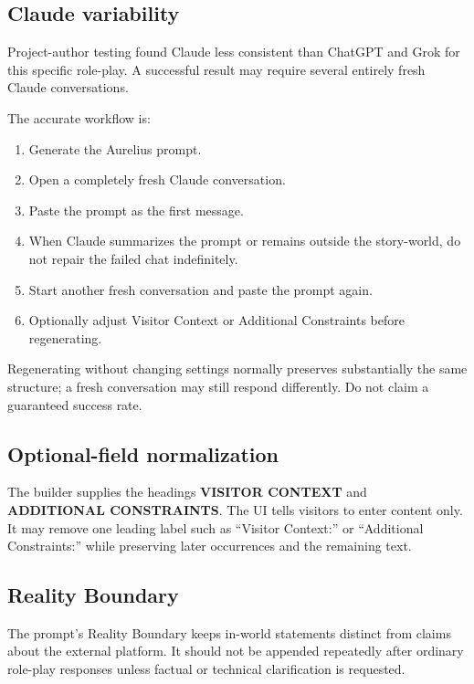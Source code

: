 \documentclass[11pt,letterpaper]{article}
\newcommand{\term}[1]{\textbf{\textsf{#1}}}
\begin{document}
\subsection{Claude variability}

Project-author testing found Claude less consistent than ChatGPT and Grok for
this specific role-play. A successful result may require several entirely
fresh Claude conversations.

The accurate workflow is:

\begin{enumerate}
    \item Generate the Aurelius prompt.
    \item Open a completely fresh Claude conversation.
    \item Paste the prompt as the first message.
    \item When Claude summarizes the prompt or remains outside the story-world,
          do not repair the failed chat indefinitely.
    \item Start another fresh conversation and paste the prompt again.
    \item Optionally adjust Visitor Context or Additional Constraints before
          regenerating.
\end{enumerate}

Regenerating without changing settings normally preserves substantially the
same structure; a fresh conversation may still respond differently. Do not
claim a guaranteed success rate.

\subsection{Optional-field normalization}

The builder supplies the headings \term{VISITOR CONTEXT} and
\term{ADDITIONAL CONSTRAINTS}. The UI tells visitors to enter content only. It
may remove one leading label such as ``Visitor Context:'' or ``Additional
Constraints:'' while preserving later occurrences and the remaining text.

\subsection{Reality Boundary}

The prompt's Reality Boundary keeps in-world statements distinct from claims
about the external platform. It should not be appended repeatedly after
ordinary role-play responses unless factual or technical clarification is
requested.
\end{document}
